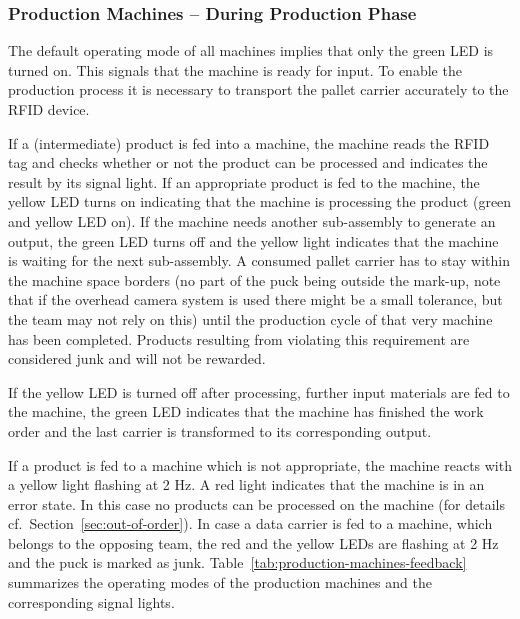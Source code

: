\documentclass[12pt,twoside]{article}
\newcommand{\refsec}[1]{Section~\ref{#1}}
\begin{document}
\vspace*{-2mm}
\subsubsection{Production Machines -- During Production Phase}
The default operating mode of all machines implies that only the green
LED is turned on. This signals that the machine is ready for input.
To enable the production process it is necessary to transport the
pallet carrier accurately to the RFID device.

If a (intermediate) product is fed into a machine, the machine reads
the RFID tag and checks whether or not the product can be processed
and indicates the result by its signal light. If an appropriate
product is fed to the machine, the yellow LED turns on indicating that
the machine is processing the product (green and yellow LED on). If
the machine needs another sub-assembly to generate an output, the
green LED turns off and the yellow light indicates that the machine is
waiting for the next sub-assembly. A consumed pallet carrier has to
stay within the machine space borders (no part of the puck being
outside the mark-up, note that if the overhead camera system is used
there might be a small tolerance, but the team may not rely on this)
until the production cycle of that very machine has been completed.
Products resulting from violating this requirement are considered junk
and will not be rewarded.

If the yellow LED is turned off after processing, further input
materials are fed to the machine, the green LED indicates that the
machine has finished the work order and the last carrier is
transformed to its corresponding output.

If a product is fed to a machine which is not appropriate, the machine
reacts with a yellow light flashing at 2 Hz. A red light indicates
that the machine is in an error state.  In this case no products can
be processed on the machine (for details
cf.~\refsec{sec:out-of-order}). In case a data carrier is fed to a
machine, which belongs to the opposing team, the red and the yellow
LEDs are flashing at 2 Hz and the puck is marked as junk.
Table~\ref{tab:production-machines-feedback} summarizes the operating
modes of the production machines and the corresponding signal lights.
\end{document}
